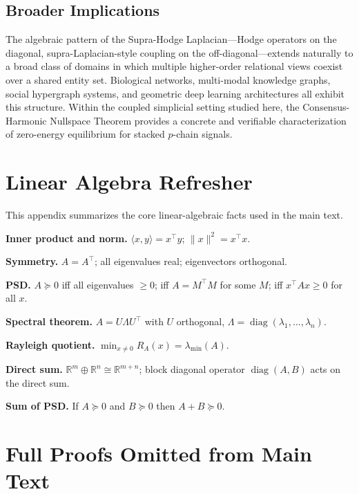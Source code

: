 \documentclass[11pt]{article}
\theoremstyle{definition}
\theoremstyle{remark}
\newcommand{\R}{\mathbb{R}}
\DeclareMathOperator{\diag}{diag}
\begin{document}
\subsection{Broader Implications}

The algebraic pattern of the Supra-Hodge Laplacian---Hodge operators on the
diagonal, supra-Laplacian-style coupling on the off-diagonal---extends naturally to
a broad class of domains in which multiple higher-order relational views coexist over a shared
entity set. Biological networks, multi-modal knowledge graphs, social
hypergraph systems, and geometric deep learning architectures all exhibit this
structure. Within the coupled simplicial setting studied here, the
Consensus-Harmonic Nullspace Theorem provides a concrete and verifiable
characterization of zero-energy equilibrium for stacked $p$-chain signals.


\appendix

\clearpage
\section{Linear Algebra Refresher}
\label{app:linalg}

This appendix summarizes the core linear-algebraic facts used in the main text.

\textbf{Inner product and norm.} $\langle x,y\rangle = x^\top y$;
$\|x\|^2 = x^\top x$.

\textbf{Symmetry.} $A=A^\top$; all eigenvalues real; eigenvectors orthogonal.

\textbf{PSD.} $A\succeq 0$ iff all eigenvalues $\geq 0$; iff $A=M^\top M$ for
some $M$; iff $x^\top Ax\geq 0$ for all $x$.

\textbf{Spectral theorem.} $A=U\Lambda U^\top$ with $U$ orthogonal,
$\Lambda=\diag(\lambda_1,\dots,\lambda_n)$.

\textbf{Rayleigh quotient.} $\min_{x\neq 0}R_A(x)=\lambda_{\min}(A)$.

\textbf{Direct sum.} $\R^m\oplus\R^n\cong\R^{m+n}$; block diagonal operator
$\diag(A,B)$ acts on the direct sum.

\textbf{Sum of PSD.} If $A\succeq 0$ and $B\succeq 0$ then $A+B\succeq 0$.

\clearpage
\section{Full Proofs Omitted from Main Text}
\label{app:proofs}
\end{document}
